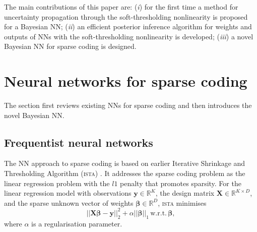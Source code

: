 \documentclass{article}
\begin{document}
  The main contributions of this paper are: (\textit{i}) for the first time a method for uncertainty propagation through the soft-thresholding nonlinearity is proposed for a Bayesian NN; (\textit{ii}) an efficient posterior inference algorithm for weights and outputs of NNs with the soft-thresholding nonlinearity is developed; (\textit{iii}) a novel Bayesian NN for sparse coding is designed.


\section{Neural networks for sparse coding}
  \label{sec:bayesian_lista}
  The section first reviews existing NNs for sparse coding and then introduces the novel Bayesian NN.
  
\subsection{Frequentist neural networks}  
\label{subsec:nn_sc}
  The NN approach to sparse coding is based on earlier Iterative Shrinkage and Thresholding Algorithm (\textsc{ista}) \cite{daubechies2004iterative}. It addresses the sparse coding problem as the linear regression problem with the $l1$ penalty that promotes sparsity. For the linear regression model with observations $\mathbf{y} \in \mathbb{R}^K$, the design matrix $\mathbf{X} \in \mathbb{R}^{K \times D}$, and the sparse unknown vector of weights $\boldsymbol\beta \in \mathbb{R}^D$, \textsc{ista} minimises
  \begin{equation}
  \label{eq:regression_problem}
  ||\mathbf{X}\boldsymbol\beta - \mathbf{y}||_2^2 + \alpha ||\boldsymbol\beta||_1 \, \text{w.r.t.} \, \boldsymbol\beta,
  \end{equation}
where $\alpha$ is a regularisation parameter.
 
\end{document}
